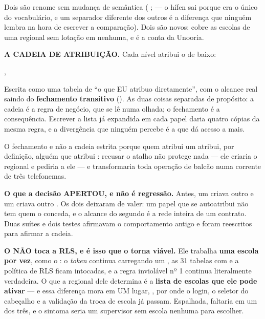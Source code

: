 Dois são renome sem mudança de semântica ( \seta{}
;  \seta{}  --- o
hífen sai porque era o único do vocabulário, e um separador diferente dos
outros é a diferença que ninguém lembra na hora de escrever a comparação). Dois
são novos:  cobre as escolas de uma regional sem lotação em
nenhuma, e  é a conta da Unooria.

\textbf{A CADEIA DE ATRIBUIÇÃO.} Cada nível atribui o de baixo:

\begin{center}
 \seta{}  \seta{}  \seta{}
 \seta{} , 
\end{center}

Escrita como uma tabela de \enquote{o que EU atribuo diretamente}, com o alcance
real saindo do \textbf{fechamento transitivo} (). As duas
coisas separadas de propósito: a cadeia é a regra de negócio, que se lê numa
olhada; o fechamento é a consequência. Escrever a lista já expandida em cada
papel daria quatro cópias da mesma regra, e a divergência que ninguém percebe é
a que dá acesso a mais.

O fechamento e não a cadeia estrita porque quem atribui um 
atribui, por definição, alguém que atribui : recusar o atalho
não protege nada --- ele criaria o regional e pediria a ele --- e transformaria
toda operação de balcão numa corrente de três telefonemas.

\textbf{O que a decisão APERTOU, e não é regressão.} Antes, um  criava
outro  e um  criava outro . Os
dois deixaram de valer: um papel que se autoatribui não tem quem o conceda, e o
alcance do segundo é a rede inteira de um contrato. Duas suítes e dois testes
afirmavam o comportamento antigo e foram reescritos para afirmar a cadeia.

\textbf{O  NÃO toca a RLS, e é isso que o torna viável.} Ele
trabalha \textbf{uma escola por vez}, como o : o \emph{token}
continua carregando um , as 31 tabelas com  e a
política de RLS ficam intocadas, e a regra inviolável nº 1 continua literalmente
verdadeira. O que a regional dele determina é a \textbf{lista de escolas que ele
pode ativar} --- e essa diferença mora em UM lugar, , por
onde o login, o seletor do cabeçalho e a validação da troca de escola já passam.
Espalhada, faltaria em um dos três, e o sintoma seria um supervisor sem escola
nenhuma para escolher.

